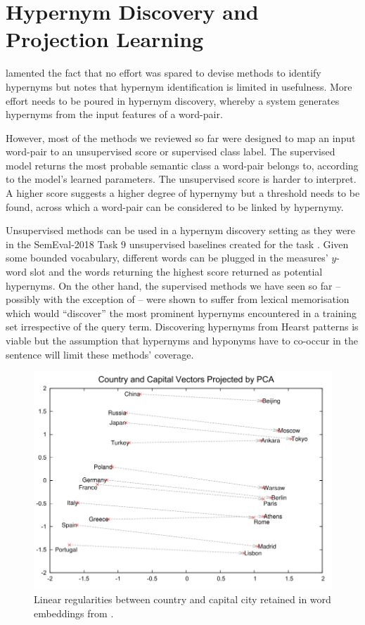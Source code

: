 \section{Hypernym Discovery and Projection Learning}
\citet{camacho2017we} lamented the fact that no effort was spared to devise methods to identify hypernyms but notes that hypernym identification is limited in usefulness.  More effort needs to be poured in hypernym discovery, whereby a system generates hypernyms from the input features of a word-pair.  

However, most of the methods we reviewed so far were designed to map an input word-pair to an unsupervised score or supervised class label.  The supervised model returns the most probable semantic class a word-pair belongs to, according to the model’s learned parameters.  The unsupervised score is harder to interpret.  A higher score suggests a higher degree of hypernymy but a threshold needs to be found, across which a word-pair can be considered to be linked by hypernymy.  

Unsupervised methods can be used in a hypernym discovery setting as they were in the SemEval-2018 Task 9 unsupervised baselines created for the task \citep{camacho2018semeval}.  Given some bounded vocabulary, different words can be plugged in the measures’ $y$-word slot and the words returning the highest score returned as potential hypernyms.  On the other hand, the supervised methods we have seen so far – possibly with the exception of \citep{Snow2004} – were shown to suffer from lexical memorisation which would ``discover'' the most prominent hypernyms encountered in a training set irrespective of the query term.    Discovering hypernyms from Hearst patterns is viable \citep{hearst1992automatic, wu2012probase, Snow2004} but the assumption that hypernyms and hyponyms have to co-occur in the sentence will limit these methods’ coverage.  

\begin{figure}[ht!] 
  \centering
  \includegraphics[width=1.\linewidth]{images/mikolov_semantic_regularity.png}
  \caption{Linear regularities between country and capital city retained in word embeddings from \citep{mikolov2013distributed}.}
  \label{fig:mikolov_capital_cities}
\end{figure}

